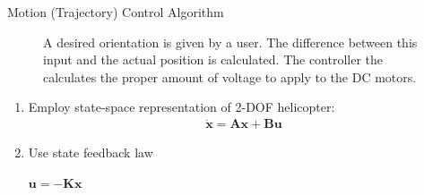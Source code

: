 \documentclass[final]{beamer}
\newlength{\onecolwid}
\begin{document}
\begin{frame}[t]
\begin{columns}[t]
\begin{column}{\onecolwid}
\begin{block}{Motion (Trajectory) Control Algorithm}
\vskip -1cm
\begin{figure}
    \centering
    \caption{A desired orientation is given by a user.  The difference between this input and the actual position is calculated.  The controller the calculates the proper amount of voltage to apply to the DC motors.}
    \label{fig:algorithmFramework}
\end{figure}
\vskip -1cm
\begin{enumerate}
    \item Employ state-space representation of 2-DOF helicopter:
    \begin{align*}
        \dot{\mathbf{x}} = \mathbf{A}\mathbf{x} + \mathbf{B}\mathbf{u}
    \end{align*}
    \item Use state feedback law
    \begin{center}
        \vskip -1cm
        $\mathbf{u} = -\mathbf{K}\mathbf{x}$

\end{center}
\end{enumerate}
\end{block}
\end{column}
\end{columns}
\end{frame}
\end{document}
